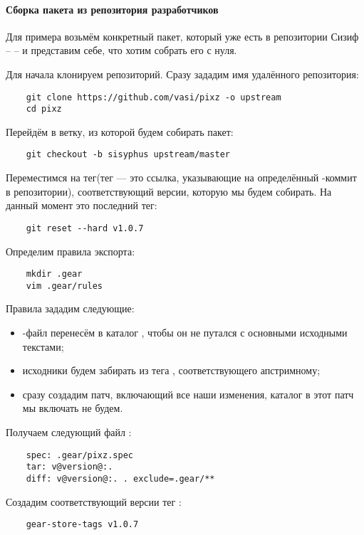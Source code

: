 \paragraph{Сборка пакета из репозитория разработчиков}
Для примера возьмём конкретный пакет, который уже есть в репозитории Сизиф --  -- и представим 
себе, что хотим собрать его с нуля.

Для начала клонируем репозиторий. Сразу зададим имя удалённого репозитория: 
\begin{verbatim}
	git clone https://github.com/vasi/pixz -o upstream
	cd pixz
\end{verbatim}

Перейдём в ветку, из которой будем собирать пакет: 
\begin{verbatim}
	git checkout -b sisyphus upstream/master
\end{verbatim}

Переместимся на тег(тег --- это ссылка, указывающие на определённый -коммит в репозитории), 
соответствующий версии, которую мы будем собирать. На данный момент это последний тег: 
\begin{verbatim}
	git reset --hard v1.0.7
\end{verbatim}

Определим правила экспорта: 
\begin{verbatim}
	mkdir .gear
	vim .gear/rules
\end{verbatim}

Правила зададим следующие: 
\begin{itemize}
	\item {}-файл перенесём в каталог , чтобы он не путался с основными исходными текстами;
	\item исходники будем забирать из тега , соответствующего апстримному;
	\item сразу создадим патч, включающий все наши изменения, каталог  в этот патч мы включать не будем.
\end{itemize}

Получаем следующий файл :
\begin{verbatim}
	spec: .gear/pixz.spec
	tar: v@version@:.
	diff: v@version@:. . exclude=.gear/**
\end{verbatim}

Создадим соответствующий версии тег :
\begin{verbatim}
	gear-store-tags v1.0.7
\end{verbatim} 

